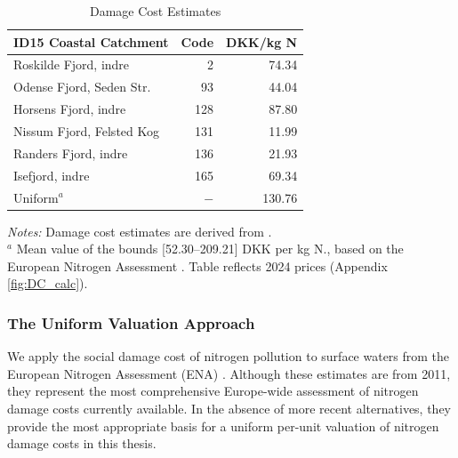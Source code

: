 \documentclass[12pt]{article}
\begin{document}
\begin{table}[htbp]
\centering
\small
\caption{Damage Cost Estimates}
\label{tab:damage-costs}
\begin{threeparttable}
\begin{tabular}{lrr}
\toprule
ID15 Coastal Catchment & Code & DKK/kg N \\
\midrule
Roskilde Fjord, indre   & 2   & 74.34  \\
Odense Fjord, Seden Str.& 93  & 44.04  \\
Horsens Fjord, indre    & 128 & 87.80  \\
Nissum Fjord, Felsted Kog& 131 & 11.99  \\
Randers Fjord, indre    & 136 & 21.93  \\
Isefjord, indre         & 165 & 69.34  \\
\midrule
Uniform$^{a}$           &  $-$  & 130.76 \\
\bottomrule
\end{tabular}
\begin{tablenotes}
\footnotesize
\item \textit{Notes:} Damage cost estimates are derived from 
\cite{andersen2019}. \\
$^{a}$ Mean value of the bounds [52.30--209.21] DKK per kg N., based on the European Nitrogen Assessment 
\citep{brink2011}. Table reflects 2024 prices (Appendix \ref{fig:DC_calc}).
\end{tablenotes}
\end{threeparttable}
\end{table}

\subsubsection{The Uniform Valuation Approach}

We apply the social damage cost of nitrogen pollution to surface waters from the European Nitrogen Assessment (ENA) \citep{brink2011}. Although these estimates are from 2011, they represent the most comprehensive Europe-wide assessment of nitrogen damage costs currently available. In the absence of more recent alternatives, they provide the most appropriate basis for a uniform per-unit valuation of nitrogen damage costs in this thesis.
\end{document}
